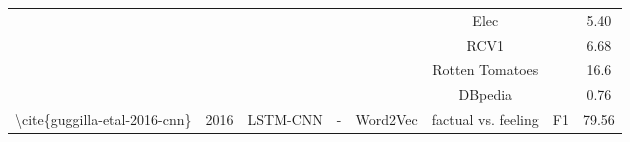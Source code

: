 \begin{table}[]
\begin{tabular}{|c|c|c|c|c|c|cc|}
                                                                                          &                                            &                                                   &                                                           &                                                                                                                        & Elec                                                  & \multicolumn{1}{c|}{}                                                                                                              & 5.40                       \\ \cline{6-6} \cline{8-8} 
                                                                                          &                                            &                                                   &                                                           &                                                                                                                        & RCV1                                                  & \multicolumn{1}{c|}{}                                                                                                              & 6.68                       \\ \cline{6-6} \cline{8-8} 
                                                                                          &                                            &                                                   &                                                           &                                                                                                                        & Rotten Tomatoes                                       & \multicolumn{1}{c|}{}                                                                                                              & 16.6                       \\ \cline{6-6} \cline{8-8} 
                                                                                          &                                            &                                                   &                                                           &                                                                                                                        & DBpedia                                               & \multicolumn{1}{c|}{}                                                                                                              & 0.76                       \\ \hline
    \textbackslash{}cite\{guggilla-etal-2016-cnn\}                                        & 2016                                       & LSTM-CNN                                          & -                                                         & Word2Vec                                                                                                               & factual vs. feeling                                   & \multicolumn{1}{c|}{F1}                                                                                                            & 79.56                      \\ \hline

\end{tabular}
\end{table}
